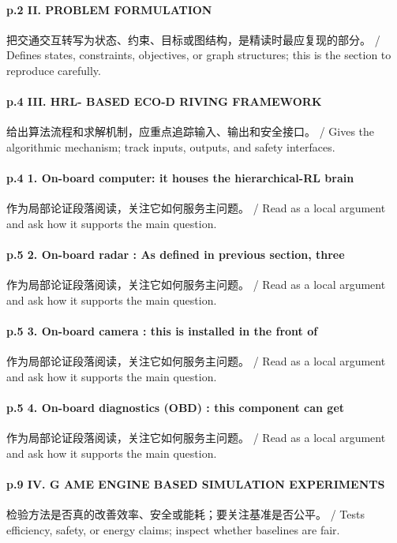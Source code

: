 \documentclass[UTF8,a4paper,11pt,fontset=fandol]{ctexart}
\begin{document}
\paragraph{p.2 II. PROBLEM FORMULATION}把交通交互转写为状态、约束、目标或图结构，是精读时最应复现的部分。 / Defines states, constraints, objectives, or graph structures; this is the section to reproduce carefully.

\paragraph{p.4 III. HRL- BASED ECO-D RIVING FRAMEWORK}给出算法流程和求解机制，应重点追踪输入、输出和安全接口。 / Gives the algorithmic mechanism; track inputs, outputs, and safety interfaces.

\paragraph{p.4 1. On-board computer: it houses the hierarchical-RL brain}作为局部论证段落阅读，关注它如何服务主问题。 / Read as a local argument and ask how it supports the main question.

\paragraph{p.5 2. On-board radar : As deﬁned in previous section, three}作为局部论证段落阅读，关注它如何服务主问题。 / Read as a local argument and ask how it supports the main question.

\paragraph{p.5 3. On-board camera : this is installed in the front of}作为局部论证段落阅读，关注它如何服务主问题。 / Read as a local argument and ask how it supports the main question.

\paragraph{p.5 4. On-board diagnostics (OBD) : this component can get}作为局部论证段落阅读，关注它如何服务主问题。 / Read as a local argument and ask how it supports the main question.

\paragraph{p.9 IV. G AME ENGINE BASED SIMULATION EXPERIMENTS}检验方法是否真的改善效率、安全或能耗；要关注基准是否公平。 / Tests efficiency, safety, or energy claims; inspect whether baselines are fair.
\end{document}
